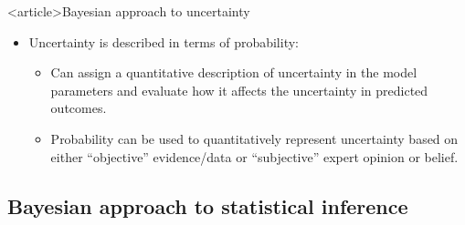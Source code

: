 \documentclass{beamer}
\begin{document}
\begin{frame}<article>{Bayesian approach to uncertainty}

\begin{itemize}
\item Uncertainty is described in terms of probability:
\begin{itemize}
 \item Can assign a quantitative description of uncertainty in the model parameters and evaluate how it affects the uncertainty in predicted outcomes.
\item Probability can be used to quantitatively represent uncertainty based on either “objective” evidence/data or “subjective” expert opinion or belief.
\end{itemize}
\end{itemize}
\vspace{-0.35in}

\end{frame}

\subsection{Bayesian approach to statistical inference}
\end{document}
